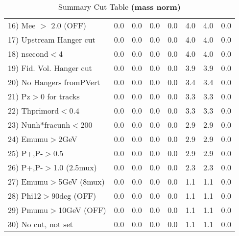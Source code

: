 \begin{table}[h!]
{{\begin{tabular}{||l||r|r|r|r|r||r||r||}
 16) Mee $>$ 2.0  (OFF)   &       0.0 &       0.0 &       0.0 &       0.0 &       4.0 &       4.0 &       0.0 \\
 17) Upstream Hanger cut  &       0.0 &       0.0 &       0.0 &       0.0 &       4.0 &       4.0 &       0.0 \\
 18) nsecond$<$4          &       0.0 &       0.0 &       0.0 &       0.0 &       4.0 &       4.0 &       0.0 \\
 19) Fid. Vol. Hanger cut &       0.0 &       0.0 &       0.0 &       0.0 &       3.9 &       3.9 &       0.0 \\
 20) No Hangers fromPVert &       0.0 &       0.0 &       0.0 &       0.0 &       3.4 &       3.4 &       0.0 \\
 21) Pz$>$0 for tracks    &       0.0 &       0.0 &       0.0 &       0.0 &       3.3 &       3.3 &       0.0 \\
 22) Thprimord$<$0.4      &       0.0 &       0.0 &       0.0 &       0.0 &       3.3 &       3.3 &       0.0 \\
 23) Nunh*fracunh$<$200   &       0.0 &       0.0 &       0.0 &       0.0 &       2.9 &       2.9 &       0.0 \\
 24) Emumu$>$2GeV         &       0.0 &       0.0 &       0.0 &       0.0 &       2.9 &       2.9 &       0.0 \\
 25) P+,P-$>$0.5          &       0.0 &       0.0 &       0.0 &       0.0 &       2.9 &       2.9 &       0.0 \\
 26) P+,P-$>$1.0 (2.5mux) &       0.0 &       0.0 &       0.0 &       0.0 &       2.3 &       2.3 &       0.0 \\
 27) Emumu$>$5GeV  (8mux) &       0.0 &       0.0 &       0.0 &       0.0 &       1.1 &       1.1 &       0.0 \\
 28) Phi12$>$90deg  (OFF) &       0.0 &       0.0 &       0.0 &       0.0 &       1.1 &       1.1 &       0.0 \\
 29) Pmumu$>$10GeV  (OFF) &       0.0 &       0.0 &       0.0 &       0.0 &       1.1 &       1.1 &       0.0 \\
 30) No cut, not set      &       0.0 &       0.0 &       0.0 &       0.0 &       1.1 &       1.1 &       0.0 \\
 \hline
 \hline
 \end{tabular}
 \caption{Summary Cut Table \textbf{ (mass norm) }}
 \label{tab-sumcut}
 }}
 \end{table}
 \endinput
